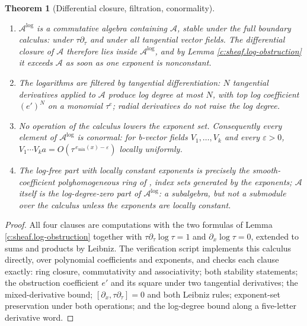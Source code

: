 \documentclass[11pt]{article}
\newtheorem{theorem}{Theorem}[section]
\theoremstyle{definition}
\theoremstyle{plain}
\begin{document}
\begin{theorem}[Differential closure, filtration, conormality]\label{c:sheaf.differential-closure-filtration-conormality}
\begin{enumerate}
\item $\mathcal{A}^{\log}$ is a commutative algebra containing $\mathcal{A}$, stable under the full boundary calculus: under $\tau\partial_\tau$ and under all tangential vector fields. The differential closure of $\mathcal{A}$ therefore lies inside $\mathcal{A}^{\log}$, and by Lemma \ref{c:sheaf.log-obstruction} it exceeds $\mathcal{A}$ as soon as one exponent is nonconstant.
\item The logarithms are filtered by tangential differentiation: $N$ tangential derivatives applied to $\mathcal{A}$ produce log degree at most $N$, with top log coefficient $(e')^N$ on a monomial $\tau^{e}$; radial derivatives do not raise the log degree.
\item No operation of the calculus lowers the exponent set. Consequently every element of $\mathcal{A}^{\log}$ is conormal: for b-vector fields $V_1,\dots,V_k$ and every $\varepsilon>0$, $V_1\cdots V_k a = O(\tau^{\,e_{\min}(x)-\varepsilon})$ locally uniformly.
\item The log-free part with locally constant exponents is precisely the smooth-coefficient polyhomogeneous ring of \cite{Melrose1993}, index sets generated by the exponents; $\mathcal{A}$ itself is the log-degree-zero part of $\mathcal{A}^{\log}$: a subalgebra, but not a submodule over the calculus unless the exponents are locally constant.
\end{enumerate}
\end{theorem}
\begin{proof}
All four clauses are computations with the two formulas of Lemma \ref{c:sheaf.log-obstruction} together with $\tau\partial_\tau \log\tau = 1$ and $\partial_x\log\tau = 0$, extended to sums and products by Leibniz. The verification script implements this calculus directly, over polynomial coefficients and exponents, and checks each clause exactly: ring closure, commutativity and associativity; both stability statements; the obstruction coefficient $e'$ and its square under two tangential derivatives; the mixed-derivative bound; $[\partial_x, \tau\partial_\tau]=0$ and both Leibniz rules; exponent-set preservation under both operations; and the log-degree bound along a five-letter derivative word.

\end{proof}
\end{document}
